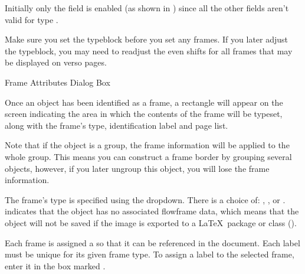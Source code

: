 
Initially only the  field
is enabled (as shown in ) since all the other
fields aren't valid for type .

\begin{warning}
Make sure you set the typeblock before you set any frames.
If you later adjust the typeblock, you may need to readjust the even
shifts for all frames that may be displayed on \gls{verso} pages.
\end{warning}

{}
{Frame Attributes Dialog Box}

Once an \gls*{object} has been identified as a frame, a
 rectangle will appear on the screen indicating the area in
which the contents of the frame will be typeset, along with the
frame's type, identification label and page list.

\begin{information}
Note that if the \gls*{object} is a \gls{group}, the frame
information will be applied to the whole group. This means you can
construct a frame border by grouping several objects, however, if
you later ungroup this \gls*{object}, you will lose the frame
information.
\end{information}


The frame's type is specified using the 
 \gls*{dropdown}. There is a choice of:
, ,
 or .
 indicates that the \gls{object} has
no associated flowframe data, which means that the object will not
be saved if the image is exported to a \LaTeX\ package or
class ().


Each frame is assigned a  so that it can be referenced in the
document. Each label must be unique for its given frame type.  To
assign a label to the selected frame, enter it in the box
marked .

